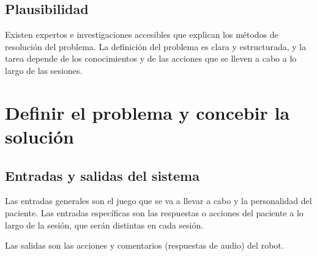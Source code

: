 \documentclass{uc3mpracticas}
\begin{document}
  \subsection{Plausibilidad}

  Existen expertos e investigaciones accesibles que explican los métodos de resolución del problema. La definición del problema es clara y estructurada, y la tarea depende de los conocimientos y de las acciones que se lleven a cabo a lo largo de las sesiones.

  \section{Definir el problema y concebir la solución}
  \subsection{Entradas y salidas del sistema}

  Las entradas generales son el juego que se va a llevar a cabo y la personalidad del paciente. Las entradas específicas son las respuestas o acciones del paciente a lo largo de la sesión, que serán distintas en cada sesión.

  \vspace{2mm}

  Las salidas son las acciones y comentarios (respuestas de audio) del robot.
\end{document}
